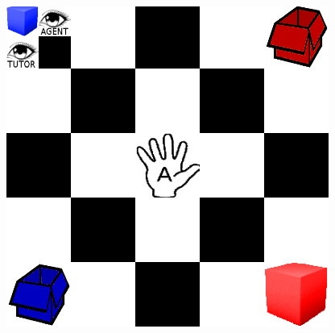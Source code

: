 \documentclass[letterpaper, 10 pt, conference]{ieeeconf}  %
\begin{document}
\begin{figure}
\centering
\hfill
\begin{minipage}[b][\ht0][s]{.3\textwidth}
\vfill

\includegraphics[width=\textwidth]{grid.png}

\end{minipage}
\end{figure}
\end{document}
